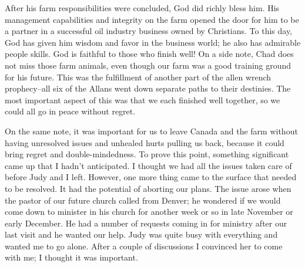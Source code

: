 \documentclass[twoside, 12pt]{book}
\begin{document}
After his farm responsibilities were concluded, God did richly bless him. His management capabilities and integrity on the farm opened the door for him to be a partner in a successful oil industry business owned by Christians. To this day, God has given him wisdom and favor in the business world; he also has admirable people skills. God is faithful to those who finish well! On a side note, Chad does not miss those farm animals, even though our farm was a good training ground for his future. This was the fulfillment of another part of the allen wrench prophecy--all six of the Allans went down separate paths to their destinies. The most important aspect of this was that we each finished well together, so we could all go in peace without regret. 

On the same note, it was important for us to leave Canada and the farm without having unresolved issues and unhealed hurts pulling us back, because it could bring regret and double-mindedness. To prove this point, something significant came up that I hadn’t anticipated. I thought we had all the issues taken care of before Judy and I left. However, one more thing came to the surface that needed to be resolved. It had the potential of aborting our plans. The issue arose when the pastor of our future church called from Denver; he wondered if we would come down to minister in his church for another week or so in late November or early December. He had a number of requests coming in for ministry after our last visit and he wanted our help. Judy was quite busy with everything and wanted me to go alone. After a couple of discussions I convinced her to come with me; I thought it was important. 
\end{document}
